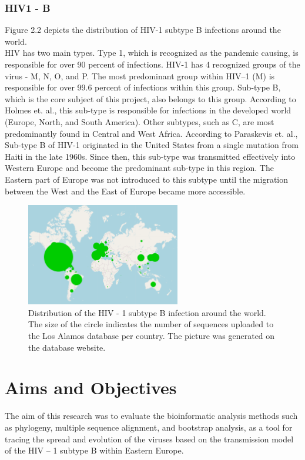         \subsubsection{HIV1 - B}

Figure 2.2 depicts the distribution of HIV-1 subtype B infections around the world.\\
HIV has two main types. 
Type 1, which is recognized as the pandemic causing, is responsible for over 90 percent of infections. 
HIV-1 has 4 recognized groups of the virus - M, N, O, and P.
The most predominant group within HIV–1 (M) is responsible for over 99.6 percent of infections within this group.\cite{kandathil_2005_molecular}
Sub-type B, which is the core subject of this project, also belongs to this group. 
According to  Holmes et. al., this sub-type is responsible for infections in the developed world (Europe, North, and South America). 
Other subtypes, such as C, are most predominantly found in Central and West Africa. \cite{holmes_1995_revealing}
According to Paraskevis et. al., Sub-type B of HIV-1 originated in the United States from a single mutation from Haiti in the late 1960s. 
Since then, this sub-type was transmitted effectively into Western Europe and become the predominant sub-type in this region. 
The Eastern part of Europe was not introduced to this subtype until the migration between the West and the East of Europe became more accessible.\cite{paraskevis_2009_tracing}

\begin{figure}[h]
  \centering
\includegraphics[width=0.6\textwidth]{images/HIV1B spread across the world.png}
  \caption{Distribution of the HIV - 1 subtype B infection around the world. The size of the circle indicates the number of sequences uploaded to the Los Alamos database per country. The picture was generated on the database website.} %
  \label{fig: HIV-1 B around the world.}
\end{figure}

\section{Aims and Objectives}
The aim of this research was to evaluate the bioinformatic analysis methods such as phylogeny, multiple sequence alignment, and bootstrap analysis,  as a tool for tracing the spread and evolution of the viruses based on the transmission model of the HIV – 1 subtype B within Eastern Europe.
